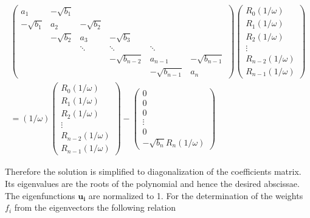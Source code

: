 \begin{equation}
 \begin{split}
 \begin{pmatrix}
a_1        & -\sqrt{b_1}&            &                &             &          \\
-\sqrt{b_1}& a_2        & -\sqrt{b_2}&                &             &          \\
           & -\sqrt{b_2}& a_3        & -\sqrt{b_3}    &             &          \\
           &            & \ddots     & \ddots         & \ddots      &          \\
           &            &            & -\sqrt{b_{n-2}}& a_{n-1}     & -\sqrt{b_{n-1}}\\
           &            &            &                & -\sqrt{b_{n-1}}& a_n   
 \end{pmatrix}
 \begin{pmatrix}
  R_0(1/\omega)\\
  R_1(1/\omega)\\
  R_2(1/\omega)\\
  \vdots\\
  R_{n-2}(1/\omega)\\
  R_{n-1}(1/\omega)
 \end{pmatrix}         \\
 = (1/\omega)
 \begin{pmatrix}
  R_0(1/\omega)\\
  R_1(1/\omega)\\
  R_2(1/\omega)\\
  \vdots\\
  R_{n-2}(1/\omega)\\
  R_{n-1}(1/\omega)
 \end{pmatrix}
 -
 \begin{pmatrix}
  0\\
  0\\
  0\\
  \vdots\\
  0\\
  -\sqrt{b_n} R_{n}(1/\omega)
 \end{pmatrix}
 \end{split}
\end{equation}

Therefore the solution is simplified to diagonalization
of the coefficients matrix. Its eigenvalues are the roots of the polynomial
and hence the desired abscissae. The eigenfunctions $\mathbf{u_i}$ are normalized to 1.
For the determination of the weights $f_i$ from the eigenvectors
the following relation 

